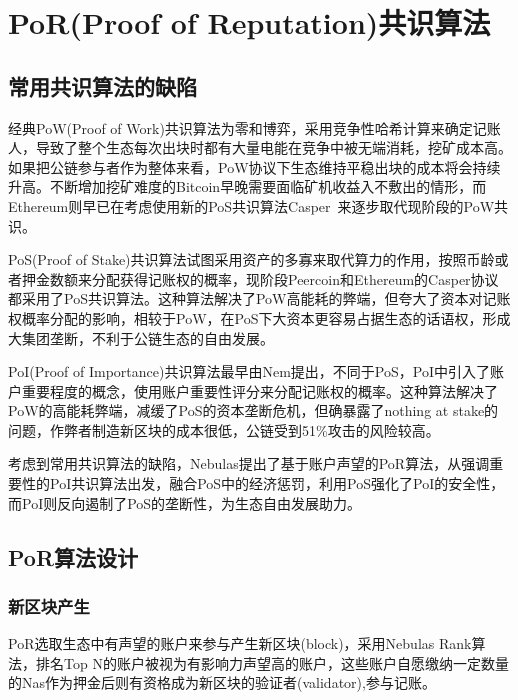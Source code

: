 \section{PoR(Proof of Reputation)共识算法}
\label{sec:por}

\subsection{常用共识算法的缺陷}
\label{por:weakness}

经典PoW(Proof of
Work)共识算法为零和博弈，采用竞争性哈希计算来确定记账人，导致了整个生态每次出块时都有大量电能在竞争中被无端消耗，挖矿成本高。如果把公链参与者作为整体来看，PoW协议下生态维持平稳出块的成本将会持续升高。不断增加挖矿难度的Bitcoin早晚需要面临矿机收益入不敷出的情形，而Ethereum则早已在考虑使用新的PoS共识算法Casper~\cite{casper}来逐步取代现阶段的PoW共识\cite{buterin2013ethereum}。

PoS(Proof of Stake)共识算法试图采用资产的多寡来取代算力的作用，按照币龄或者押金数额来分配获得记账权的概率，现阶段Peercoin\cite{king2012peercoin}和Ethereum的Casper协议都采用了PoS共识算法。这种算法解决了PoW高能耗的弊端，但夸大了资本对记账权概率分配的影响，相较于PoW，在PoS下大资本更容易占据生态的话语权，形成大集团垄断，不利于公链生态的自由发展。

PoI(Proof of Importance)共识算法最早由Nem提出\cite{nem}，不同于PoS，PoI中引入了账户重要程度的概念，使用账户重要性评分来分配记账权的概率。这种算法解决了PoW的高能耗弊端，减缓了PoS的资本垄断危机，但确暴露了nothing at stake的问题，作弊者制造新区块的成本很低，公链受到51\%攻击的风险较高。

考虑到常用共识算法的缺陷，Nebulas提出了基于账户声望的PoR算法，从强调重要性的PoI共识算法出发，融合PoS中的经济惩罚，利用PoS强化了PoI的安全性，而PoI则反向遏制了PoS的垄断性，为生态自由发展助力。

\subsection{PoR算法设计}
\label{por:design}

\subsubsection{新区块产生}
\label{por:design:block}

PoR选取生态中有声望的账户来参与产生新区块(block)，采用Nebulas Rank算法，排名Top N的账户被视为有影响力声望高的账户，这些账户自愿缴纳一定数量的Nas作为押金后则有资格成为新区块的验证者(validator),参与记账。

